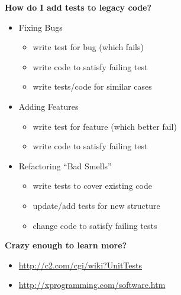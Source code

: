 \documentclass[landscape]{slides}
\begin{document}
\begin{slide}
  \begin{center}
   {\bf\Large How do I add tests to legacy code?}\\
   \vspace{0.5in}
   \begin{minipage}{6in}
    \begin{itemize}
     \item Fixing Bugs
      \begin{itemize}
       \item write test for bug {\small (which fails)}
       \item write code to satisfy failing test
       \item write tests/code for similar cases
      \end{itemize}
      \vspace{8pt}
     \item Adding Features
      \begin{itemize}
       \item write test for feature {\small (which better fail)}
       \item write code to satisfy failing test
      \end{itemize}
      \vspace{8pt}
     \item Refactoring ``Bad Smells''
      \begin{itemize}
       \item write tests to cover existing code
       \item update/add tests for new structure
       \item change code to satisfy failing tests
      \end{itemize}
    \end{itemize}
   \end{minipage}
  \end{center}
\end{slide}
\begin{slide}
  \begin{center}
    {\bf\Large Crazy enough to learn more?}\\
    \vspace{0.5in}
    \begin{minipage}{6in}
     \begin{itemize}
      \item \url{http://c2.com/cgi/wiki?UnitTests}\\[-10pt]
      \item \url{http://xprogramming.com/software.htm}
     \end{itemize}
    \end{minipage}
  \end{center}
\end{slide}
\end{document}
